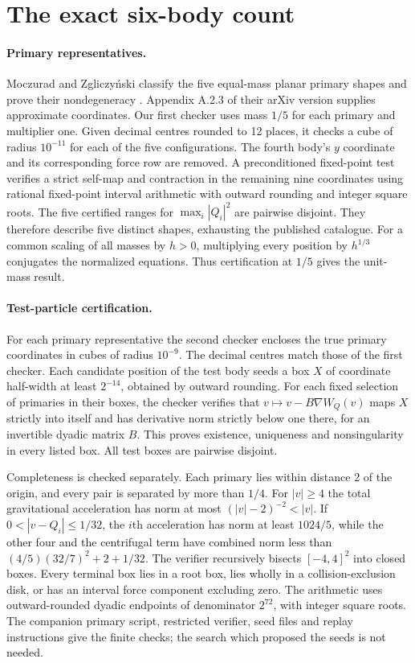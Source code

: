 \documentclass[11pt]{article}
\begin{document}
\section{The exact six-body count}

\paragraph{Primary representatives.}
Moczurad and Zgliczyński classify the five equal-mass planar primary shapes and prove their nondegeneracy \cite{equal}. Appendix A.2.3 of their arXiv version supplies approximate coordinates. Our first checker uses mass $1/5$ for each primary and multiplier one. Given decimal centres rounded to 12 places, it checks a cube of radius $10^{-11}$ for each of the five configurations. The fourth body's $y$ coordinate and its corresponding force row are removed. A preconditioned fixed-point test verifies a strict self-map and contraction in the remaining nine coordinates using rational fixed-point interval arithmetic with outward rounding and integer square roots. The five certified ranges for $\max_i |Q_i|^2$ are pairwise disjoint. They therefore describe five distinct shapes, exhausting the published catalogue. For a common scaling of all masses by $h>0$, multiplying every position by $h^{1/3}$ conjugates the normalized equations. Thus certification at $1/5$ gives the unit-mass result.

\paragraph{Test-particle certification.}
For each primary representative the second checker encloses the true primary coordinates in cubes of radius $10^{-9}$. The decimal centres match those of the first checker. Each candidate position of the test body seeds a box $X$ of coordinate half-width at least $2^{-14}$, obtained by outward rounding. For each fixed selection of primaries in their boxes, the checker verifies that $v\mapsto v-B\nabla W_Q(v)$ maps $X$ strictly into itself and has derivative norm strictly below one there, for an invertible dyadic matrix $B$. This proves existence, uniqueness and nonsingularity in every listed box. All test boxes are pairwise disjoint.

Completeness is checked separately. Each primary lies within distance 2 of the origin, and every pair is separated by more than $1/4$. For $|v|\ge4$ the total gravitational acceleration has norm at most $(|v|-2)^{-2}<|v|$. If $0<|v-Q_i|\le1/32$, the $i$th acceleration has norm at least $1024/5$, while the other four and the centrifugal term have combined norm less than $(4/5)(32/7)^2+2+1/32$. The verifier recursively bisects $[-4,4]^2$ into closed boxes. Every terminal box lies in a root box, lies wholly in a collision-exclusion disk, or has an interval force component excluding zero. The arithmetic uses outward-rounded dyadic endpoints of denominator $2^{72}$, with integer square roots. The companion primary script, restricted verifier, seed files and replay instructions give the finite checks; the search which proposed the seeds is not needed.
\end{document}
